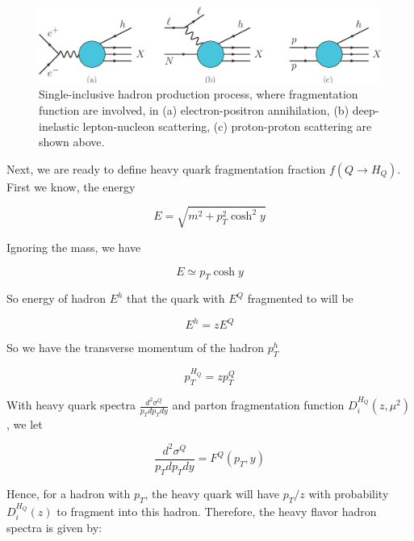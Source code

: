  \begin{figure}[hbtp]
\begin{center}
\includegraphics[width=1.0\textwidth]{Figures/Chapter1/FFProcess.png}
\caption{Single-inclusive hadron production process, where fragmentation function are involved, in (a) electron-positron annihilation, (b) deep-inelastic lepton-nucleon scattering, (c) proton-proton scattering are shown above.}
\label{FFProcess}
\end{center}
\end{figure}   

Next, we are ready to define heavy quark fragmentation fraction $f(Q \rightarrow H_Q)$. First we know, the energy

\begin{equation}
E=  \sqrt{m^2 + p_T^2 \cosh^2 y}
\end{equation}

Ignoring the mass, we have

\begin{equation}
E \simeq p_T \cosh y
\end{equation}

So energy of hadron $E^h$ that the quark with $E^Q$ fragmented to will be


\begin{equation}
E^h  = z E^Q 
\end{equation}

So we have the transverse momentum of the hadron $p_T^h$ 

\begin{equation}
p_T^{H_Q} = z p_T^Q
\end{equation}

With heavy quark spectra $ \frac{d^2\sigma^Q}{p_T dp_T dy}$ and parton fragmentation function $D_{i}^{H_Q}(z,\mu^2)$, we let


\begin{equation}
 \frac{d^2\sigma^Q}{p_T dp_T dy} = F^Q(p_T, y)
\end{equation}


Hence, for a hadron with $p_T$, the heavy quark will have $p_T/z$ with probability $D^{H_Q}_{i}(z)$ to fragment into this hadron. Therefore, the heavy flavor hadron spectra is given by:


